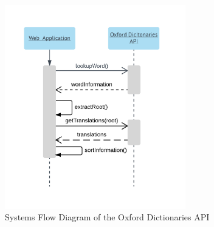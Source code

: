 \begin{figure}
	\caption{Systems Flow Diagram of the Oxford Dictionaries API}
	\label{fig:odsf}
	\begin{center}
	\includegraphics[width=0.7\textwidth]{Graphics/SystemsFlowOxford}
\end{center}
\end{figure}